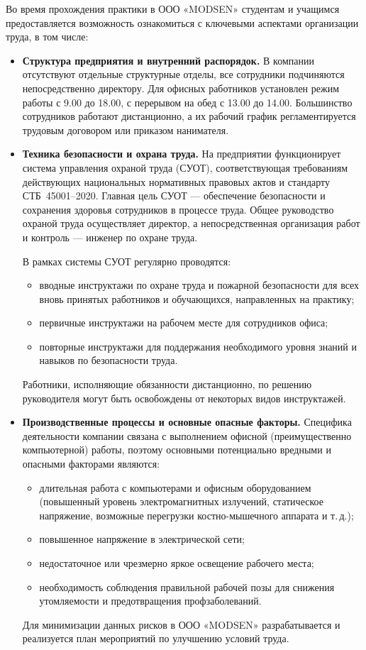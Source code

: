 Во время прохождения практики в ООО «MODSEN» студентам и учащимся предоставляется возможность ознакомиться с ключевыми аспектами организации труда, в том числе:
\begin{itemize}
    \item \textbf{Структура предприятия и внутренний распорядок.} 
    В компании отсутствуют отдельные структурные отделы, все сотрудники подчиняются непосредственно директору. Для офисных работников установлен режим работы с 9.00 до 18.00, с перерывом на обед с 13.00 до 14.00. Большинство сотрудников работают дистанционно, а их рабочий график регламентируется трудовым договором или приказом нанимателя.

    \item \textbf{Техника безопасности и охрана труда.} 
    На предприятии функционирует система управления охраной труда (СУОТ), соответствующая требованиям действующих национальных нормативных правовых актов и стандарту СТБ~45001--2020. Главная цель СУОТ --- обеспечение безопасности и сохранения здоровья сотрудников в процессе труда. Общее руководство охраной труда осуществляет директор, а непосредственная организация работ и контроль --- инженер по охране труда.

    В рамках системы СУОТ регулярно проводятся:
    \begin{itemize}
        \item вводные инструктажи по охране труда и пожарной безопасности для всех вновь принятых работников и обучающихся, направленных на практику;
        \item первичные инструктажи на рабочем месте для сотрудников офиса;
        \item повторные инструктажи для поддержания необходимого уровня знаний и навыков по безопасности труда.
    \end{itemize}
    Работники, исполняющие обязанности дистанционно, по решению руководителя могут быть освобождены от некоторых видов инструктажей.

    \item \textbf{Производственные процессы и основные опасные факторы.}
    Специфика деятельности компании связана с выполнением офисной (преимущественно компьютерной) работы, поэтому основными потенциально вредными и опасными факторами являются:
    \begin{itemize}
        \item длительная работа с компьютерами и офисным оборудованием (повышенный уровень электромагнитных излучений, статическое напряжение, возможные перегрузки костно-мышечного аппарата и т.\,д.);
        \item повышенное напряжение в электрической сети;
        \item недостаточное или чрезмерно яркое освещение рабочего места;
        \item необходимость соблюдения правильной рабочей позы для снижения утомляемости и предотвращения профзаболеваний.
    \end{itemize}
    Для минимизации данных рисков в ООО «MODSEN» разрабатывается и реализуется план мероприятий по улучшению условий труда.


\end{itemize}
